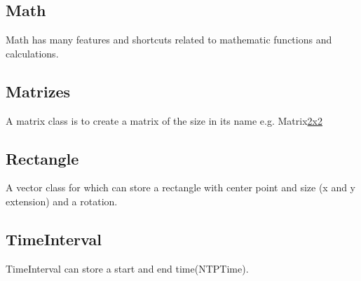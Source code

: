 \subsection{Math}
Math has many features and shortcuts related to mathematic functions and calculations. 

\subsection{Matrizes}
A matrix class is to create a matrix of the size in its name e.g. Matrix\underline{2x2}

\subsection{Rectangle}
A vector class for which can store a rectangle with center point and size (x and y extension) and a rotation.

\subsection{TimeInterval}
TimeInterval can store a start and end time(NTPTime).
\newpage
